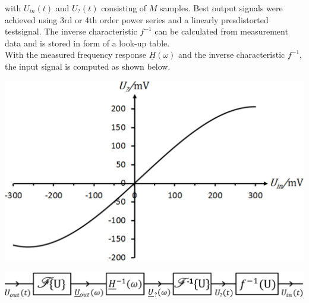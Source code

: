 \documentclass[paper=a0,accentcolor=tud9b,colorbacktitle,colorbacksubtitle]{tudposter}
\begin{document}
\begin{multicols}{2}
	\hspace{-0.7cm}
	\begin{minipage}{0.17\textwidth}
	 with $\textstyle U_{in}(t)$ and $U_?(t)$ consisting of $\textstyle M$ samples. Best output signals were achieved using 3rd or 4th order power series and
	 a linearly presdistorted testsignal.
	 The inverse characteristic $\textstyle f^{-1}$ can be calculated from measurement data and is stored in form of a look-up table.\\
	 With the measured frequency response $\textstyle \underline{H}(\omega)$ and the inverse characteristic $\textstyle f^{-1}$,  the input signal is computed as shown
	below.
	\end{minipage}
	\begin{minipage}{0.33\textwidth}
	\vspace{-0.5cm}
	 \begin{center}
	  \includegraphics[scale=1]{WEPVA047f6.eps}
	 \label{Kennlinie}
	 \end{center}
	 \vspace{0.1cm}
	\end{minipage}
	
	\vspace{0.5cm}
	\begin{center}
	 \includegraphics[scale=1.3]{WEPVA047f3_8.eps}
	 \label{Signalchain}
	 \vspace{-0.3cm}
	\end{center}
	 	

\end{multicols}
\end{document}
